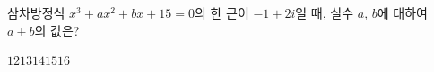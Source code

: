 삼차방정식 $x^3+ax^2+bx+15=0$의 한 근이 $-1+2i$일 때, 실수 $a$, $b$에 대하여 $a+b$의 값은?
\begin{choices32}{$12$}{$13$}{$14$}{$15$}{$16$}\end{choices32}
